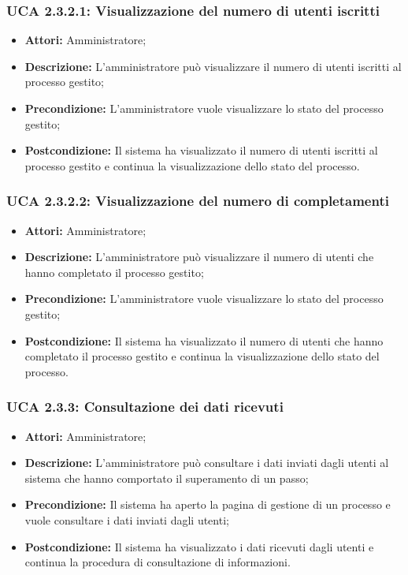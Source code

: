 \hypertarget{A2.3.2.1}{}
\subsubsection{UCA 2.3.2.1: Visualizzazione del numero di utenti iscritti}
\begin{itemize}
\item \textbf{Attori:}
Amministratore;
\item \textbf{Descrizione:}
L'amministratore può visualizzare il numero di utenti iscritti al processo gestito;
\item \textbf{Precondizione:}
L'amministratore vuole visualizzare lo stato del processo gestito;
\item \textbf{Postcondizione:}
Il sistema ha visualizzato il numero di utenti iscritti al processo gestito e continua la visualizzazione dello stato del processo.
\end{itemize}

\hypertarget{A2.3.2.2}{}
\subsubsection{UCA 2.3.2.2: Visualizzazione del numero di completamenti}
\begin{itemize}
\item \textbf{Attori:}
Amministratore;
\item \textbf{Descrizione:}
L'amministratore può visualizzare il numero di utenti che hanno completato il processo gestito;
\item \textbf{Precondizione:}
L'amministratore vuole visualizzare lo stato del processo gestito;
\item \textbf{Postcondizione:}
Il sistema ha visualizzato il numero di utenti che hanno completato il processo gestito e continua la visualizzazione dello stato del processo.
\end{itemize}

\hypertarget{A2.3.3}{}
\subsubsection{UCA 2.3.3: Consultazione dei dati ricevuti}
\begin{itemize}
\item \textbf{Attori:} Amministratore;
\item \textbf{Descrizione:}
L'amministratore può consultare i dati inviati dagli utenti al sistema che hanno comportato il superamento di un passo;
\item \textbf{Precondizione:}
Il sistema ha aperto la pagina di gestione di un processo e vuole consultare i dati inviati dagli utenti;
\item \textbf{Postcondizione:}
Il sistema ha visualizzato i dati ricevuti dagli utenti e continua la procedura di consultazione di informazioni.
\end{itemize}

